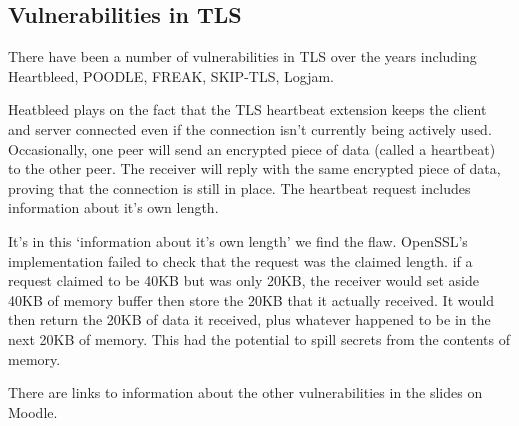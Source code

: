 \subsection{Vulnerabilities in TLS}
There have been a number of vulnerabilities in TLS over the years including Heartbleed, POODLE, FREAK, SKIP-TLS, Logjam. 

Heatbleed plays on the fact that the TLS heartbeat extension keeps the client and server connected even if the connection isn't currently being actively used. Occasionally, one peer will send an encrypted piece of data (called a heartbeat) to the other peer. The receiver will reply with the same encrypted piece of data, proving that the connection is still in place. The heartbeat request includes information about it's own length. 

It's in this `information about it's own length' we find the flaw. OpenSSL's implementation failed to check that the request was the claimed length. if a request claimed to be 40KB but was only 20KB, the receiver would set aside 40KB of memory buffer then store the 20KB that it actually received. It would then return the 20KB of data it received, plus whatever happened to be in the next 20KB of memory. This had the potential to spill secrets from the contents of memory.

\begin{extlink}
There are links to information about the other vulnerabilities in the slides on Moodle.
\end{extlink}

